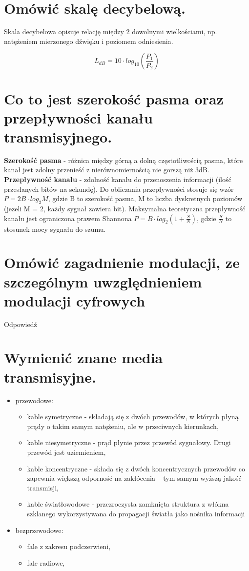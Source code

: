 \documentclass[12pt,a4paper]{article}
\begin{document}
	\section{Omówić skalę decybelową.}
	Skala decybelowa opisuje relację między 2 dowolnymi wielkościami, np. natężeniem mierzonego dźwięku i poziomem odniesienia.
	
	$$L_{dB} = 10 \cdot log_{10}\left( \frac{P_1}{P_2} \right) $$

	\section{Co to jest szerokość pasma oraz przepływności kanału transmisyjnego.}
	\textbf{Szerokość pasma} - różnica między górną a dolną częstotliwością pasma, które kanał jest zdolny przenieść z nierównomiernością nie gorszą niż 3dB.\\
	\textbf{Przepływność kanału} - zdolność kanału do przenoszenia informacji (ilość przesłanych bitów na sekundę). Do obliczania przepływności stosuje się wzór $P = 2B \cdot log_{2}M$, gdzie B to szerokość pasma, M to liczba dyskretnych poziomów (jezeli M = 2, każdy sygnał zawiera bit). Maksymalna teoretyczna przepływność kanału jest ograniczona prawem Shannona $P = B \cdot log_{2}\left( 1+ \frac{S}{N} \right)$, gdzie $\frac{S}{N}$ to stosunek mocy sygnału do szumu.

	\section{Omówić zagadnienie modulacji, ze szczególnym uwzględnieniem modulacji cyfrowych}
	Odpowiedź

	\section{Wymienić znane media transmisyjne.}
	\begin{itemize}
		\item przewodowe:
		\begin{itemize}
			\item kable symetryczne - składają się z dwóch przewodów, w których płyną prądy o takim samym natężeniu, ale w przeciwnych kierunkach,
			\item kable niesymetryczne - prąd płynie przez przewód sygnałowy. Drugi przewód jest uziemieniem,
			\item kable koncentryczne - składa się z dwóch koncentrycznych przewodów co zapewnia większą odporność na zakłócenia – tym samym wyższą jakość transmisji,
			\item kable światłowodowe - przezroczysta zamknięta struktura z włókna szklanego wykorzystywana do propagacji światła jako nośnika informacji
		\end{itemize}
		\item bezprzewodowe:
		\begin{itemize}
			\item fale z zakresu podczerwieni,
			\item fale radiowe,
		\end{itemize}
	\end{itemize}
\end{document}
